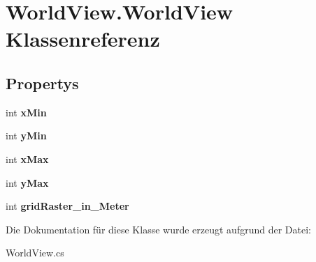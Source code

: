 \hypertarget{class_world_view_1_1_world_view}{
\section{WorldView.WorldView Klassenreferenz}
\label{class_world_view_1_1_world_view}
}
\subsection*{Propertys}
\begin{DoxyCompactItemize}
\item 
\hypertarget{class_world_view_1_1_world_view_a2e0e8a2afe07acf90233e66ecab8ace6}{
int {\bfseries xMin}}
\label{class_world_view_1_1_world_view_a2e0e8a2afe07acf90233e66ecab8ace6}

\item 
\hypertarget{class_world_view_1_1_world_view_aec7a0a84ebb415786efec971d82dc133}{
int {\bfseries yMin}}
\label{class_world_view_1_1_world_view_aec7a0a84ebb415786efec971d82dc133}

\item 
\hypertarget{class_world_view_1_1_world_view_a1482426ed71b1dca7577f815cbaffbbc}{
int {\bfseries xMax}}
\label{class_world_view_1_1_world_view_a1482426ed71b1dca7577f815cbaffbbc}

\item 
\hypertarget{class_world_view_1_1_world_view_a38e1bb41150fcb6ca03da603aa017933}{
int {\bfseries yMax}}
\label{class_world_view_1_1_world_view_a38e1bb41150fcb6ca03da603aa017933}

\item 
\hypertarget{class_world_view_1_1_world_view_a5e9e01f32c443f0f885f235e10a57348}{
int {\bfseries gridRaster\_\-in\_\-Meter}}
\label{class_world_view_1_1_world_view_a5e9e01f32c443f0f885f235e10a57348}

\end{DoxyCompactItemize}


Die Dokumentation für diese Klasse wurde erzeugt aufgrund der Datei:\begin{DoxyCompactItemize}
\item 
WorldView.cs\end{DoxyCompactItemize}
